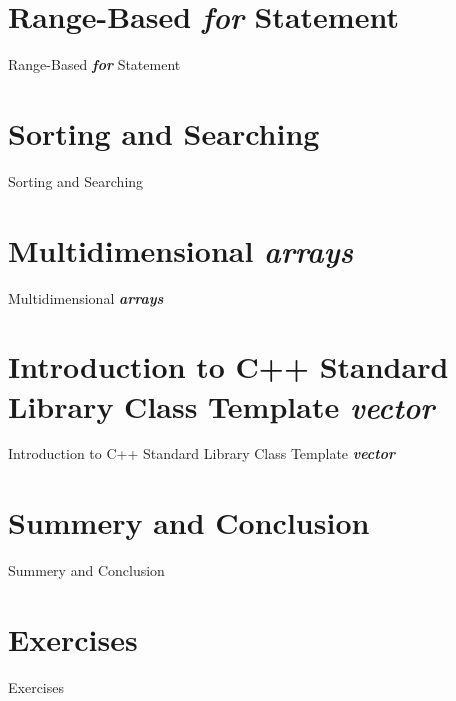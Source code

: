 \documentclass[10pt]{beamer}
\begin{document}
\section{\texorpdfstring{Range-Based \textbf{\textit{\color{lblue}for}} Statement}{Range-Based for}}
\begin{frame}{Range-Based \textbf{\textit{\color{blue}for}} Statement}
	\lipsum[2]
\end{frame}

\section{Sorting and Searching}
\begin{frame}{Sorting and Searching}
	\lipsum[2]
\end{frame}

\section{\texorpdfstring{Multidimensional \textbf{\textit{\color{lblue}arrays}}}{Multidimensional array}}
\begin{frame}{Multidimensional \textbf{\textit{\color{blue}arrays}}}
	\lipsum[2]
\end{frame}

\section{\texorpdfstring{Introduction to C++ Standard Library Class Template \textbf{\textit{\color{lblue}vector}}}{Introduction to C++ Standard Library Class Template vector}}
\begin{frame}{Introduction to C++ Standard Library Class Template \textbf{\textit{\color{blue}vector}}}
	\lipsum[2]
\end{frame}

\section{Summery and Conclusion}

\begin{frame}{Summery and Conclusion}
	\lipsum[2]
\end{frame}


\section{Exercises}

\begin{frame}{Exercises}
	\lipsum[2]
\end{frame}
\end{document}
